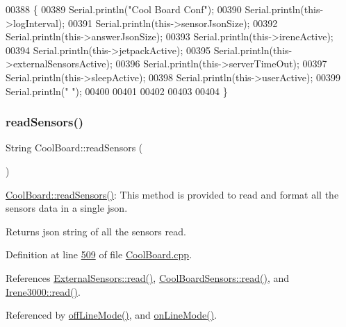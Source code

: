 \begin{DoxyCode}
00388 \{
00389     Serial.println(\textcolor{stringliteral}{"Cool Board Conf"});
00390     Serial.println(this->logInterval);
00391     Serial.println(this->sensorJsonSize);
00392     Serial.println(this->answerJsonSize);
00393     Serial.println(this->ireneActive);
00394     Serial.println(this->jetpackActive);
00395     Serial.println(this->externalSensorsActive);
00396     Serial.println(this->serverTimeOut);
00397     Serial.println(this->sleepActive);
00398     Serial.println(this->userActive);
00399     Serial.println(\textcolor{stringliteral}{" "});
00400 
00401 
00402 
00403 
00404 \}
\end{DoxyCode}
\mbox{\label{class_cool_board_ad03abdce2e65f520bbf2cff0f2d083cf}} 
\subsubsection{\texorpdfstring{read\+Sensors()}{readSensors()}}
{\footnotesize\ttfamily String Cool\+Board\+::read\+Sensors (\begin{DoxyParamCaption}{ }\end{DoxyParamCaption})}

\hyperlink{class_cool_board_ad03abdce2e65f520bbf2cff0f2d083cf}{Cool\+Board\+::read\+Sensors()}\+: This method is provided to read and format all the sensors data in a single json.

\begin{DoxyReturn}{Returns}
json string of all the sensors read. 
\end{DoxyReturn}


Definition at line \hyperlink{_cool_board_8cpp_source_l00509}{509} of file \hyperlink{_cool_board_8cpp_source}{Cool\+Board.\+cpp}.



References \hyperlink{_external_sensors_8cpp_source_l00065}{External\+Sensors\+::read()}, \hyperlink{_cool_board_sensors_8cpp_source_l00123}{Cool\+Board\+Sensors\+::read()}, and \hyperlink{irene3000_8cpp_source_l00035}{Irene3000\+::read()}.



Referenced by \hyperlink{_cool_board_8cpp_source_l00187}{off\+Line\+Mode()}, and \hyperlink{_cool_board_8cpp_source_l00097}{on\+Line\+Mode()}.


